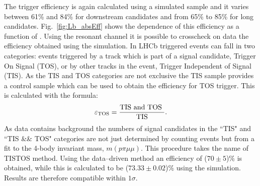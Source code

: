 The trigger efficiency is again calculated using a simulated sample and it varies between
61\% and 84\% for downstream candidates and from 65\% to 85\% for long candidates.
Fig.~\ref{fig:Lb_absEff} shows the dependence of this efficiency as a function of \qsq.
Using the resonant channel it is possible to crosscheck on data the efficiency obtained using the simulation.
In LHCb triggered events can fall in two categories: events triggered by a track which is part of a signal candidate, 
Trigger On Signal (TOS), or by other tracks in the event, Trigger Independent of Signal (TIS). 
As the TIS and TOS categories are not exclusive the TIS sample provides a control
sample which can be used to obtain the efficiency for TOS trigger. This is calculated with the formula:
\begin{equation}
\varepsilon_{\rm TOS} = \frac{\text{TIS  and TOS }}{\text{TIS}}.
\end{equation}
As data contains background the numbers of signal candidates in the ``TIS" and ``TIS \&\& TOS"
categories are not just determined by counting events but from a fit to the 4-body invariant mass, 
$m(p\pi\mu\mu)$. This procedure takes the name of TISTOS method. 
Using the data--driven method an efficiency of ($70 \pm 5$)\% is obtained, while this is calculated to be
($73.33 \pm 0.02$)\% using the simulation. Results are therefore compatible within $1\sigma$. 
%



